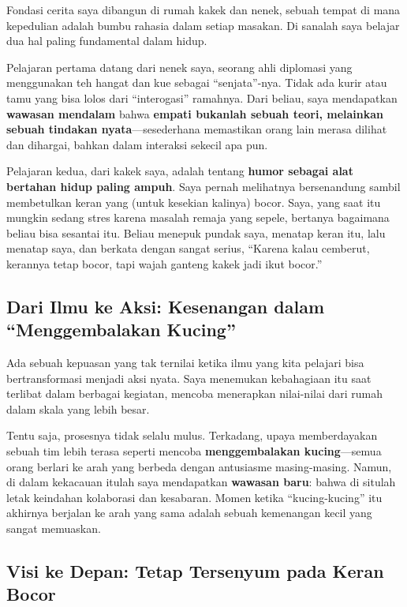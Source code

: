 \documentclass[
  letterpaper,
  DIV=11,
  numbers=noendperiod]{scrreprt}
\begin{document}
Fondasi cerita saya dibangun di rumah kakek dan nenek, sebuah tempat di
mana kepedulian adalah bumbu rahasia dalam setiap masakan. Di sanalah
saya belajar dua hal paling fundamental dalam hidup.

Pelajaran pertama datang dari nenek saya, seorang ahli diplomasi yang
menggunakan teh hangat dan kue sebagai ``senjata''-nya. Tidak ada kurir
atau tamu yang bisa lolos dari ``interogasi'' ramahnya. Dari beliau,
saya mendapatkan \textbf{wawasan mendalam} bahwa \textbf{empati bukanlah
sebuah teori, melainkan sebuah tindakan nyata}---sesederhana memastikan
orang lain merasa dilihat dan dihargai, bahkan dalam interaksi sekecil
apa pun.

Pelajaran kedua, dari kakek saya, adalah tentang \textbf{humor sebagai
alat bertahan hidup paling ampuh}. Saya pernah melihatnya bersenandung
sambil membetulkan keran yang (untuk kesekian kalinya) bocor. Saya, yang
saat itu mungkin sedang stres karena masalah remaja yang sepele,
bertanya bagaimana beliau bisa sesantai itu. Beliau menepuk pundak saya,
menatap keran itu, lalu menatap saya, dan berkata dengan sangat serius,
``Karena kalau cemberut, kerannya tetap bocor, tapi wajah ganteng kakek
jadi ikut bocor.''

\subsection{Dari Ilmu ke Aksi: Kesenangan dalam ``Menggembalakan
Kucing''}\label{dari-ilmu-ke-aksi-kesenangan-dalam-menggembalakan-kucing}

Ada sebuah kepuasan yang tak ternilai ketika ilmu yang kita pelajari
bisa bertransformasi menjadi aksi nyata. Saya menemukan kebahagiaan itu
saat terlibat dalam berbagai kegiatan, mencoba menerapkan nilai-nilai
dari rumah dalam skala yang lebih besar.

Tentu saja, prosesnya tidak selalu mulus. Terkadang, upaya memberdayakan
sebuah tim lebih terasa seperti mencoba \textbf{menggembalakan
kucing}---semua orang berlari ke arah yang berbeda dengan antusiasme
masing-masing. Namun, di dalam kekacauan itulah saya mendapatkan
\textbf{wawasan baru}: bahwa di situlah letak keindahan kolaborasi dan
kesabaran. Momen ketika ``kucing-kucing'' itu akhirnya berjalan ke arah
yang sama adalah sebuah kemenangan kecil yang sangat memuaskan.

\subsection{Visi ke Depan: Tetap Tersenyum pada Keran
Bocor}\label{visi-ke-depan-tetap-tersenyum-pada-keran-bocor}
\end{document}
